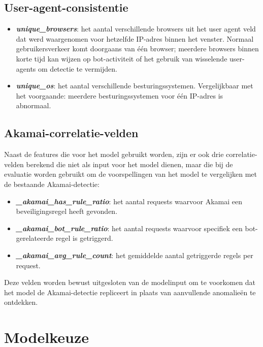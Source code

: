 \subsection{User-agent-consistentie}  
\label{subsec:user-agent-consistentie}

\begin{itemize}
    \item \textbf{\textit{unique\_browsers}}: het aantal verschillende browsers uit het user agent veld dat werd waargenomen voor hetzelfde IP-adres binnen het venster. Normaal gebruikersverkeer komt doorgaans van één browser; meerdere browsers binnen korte tijd kan wijzen op bot-activiteit of het gebruik van wisselende user-agents om detectie te vermijden.
    \item \textbf{\textit{unique\_os}}: het aantal verschillende besturingssystemen. Vergelijkbaar met het voorgaande: meerdere besturingssystemen voor één IP-adres is abnormaal.
\end{itemize}

\subsection{Akamai-correlatie-velden} 
\label{subsec:akamai-correlatie-velden}

Naast de features die voor het model gebruikt worden, zijn er ook drie correlatie-velden berekend die niet als input voor het model dienen, maar die bij de evaluatie worden gebruikt om de voorspellingen van het model te vergelijken met de bestaande Akamai-detectie:

\begin{itemize}
    \item \textbf{\textit{\_akamai\_has\_rule\_ratio}}: het aantal requests waarvoor Akamai een beveiligingsregel heeft gevonden.
    \item \textbf{\textit{\_akamai\_bot\_rule\_ratio}}: het aantal requests waarvoor specifiek een bot-gerelateerde regel is getriggerd.
    \item \textbf{\textit{\_akamai\_avg\_rule\_count}}: het gemiddelde aantal getriggerde regels per request.
\end{itemize}

Deze velden worden bewust uitgesloten van de modelinput om te voorkomen dat het model de Akamai-detectie repliceert in plaats van aanvullende anomalieën te ontdekken.

\section{Modelkeuze} 
\label{sec:modelkeuze}

